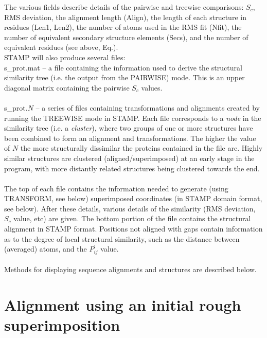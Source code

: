 The various fields describe details of the pairwise and treewise
comparisons: $S_{c}$, RMS deviation, the alignment length (Align),
the length of each structure in residues (Len1, Len2), the number of
atoms used in the RMS fit (Nfit), the number of equivalent secondary
structure elements (Secs), and the number of equivalent residues
(see above, Eq.).\\

STAMP will also produce several files: \\

s\_prot.mat -- a file containing the information used to derive the 
structural similarity tree (i.e. the output from the PAIRWISE) mode.  This
is an upper diagonal matrix containing the pairwise $S_{c}$ values.\\
\\
s\_prot.$N$ -- a series of files containing transformations and alignments 
created by running the TREEWISE mode in STAMP.  Each file corresponds to 
a {\em node} in the similarity tree (i.e. a {\em cluster}), where two 
groups of one or more structures have been combined to form an
alignment and transformations.  The higher the value of $N$ the more 
structurally dissimilar the proteins contained in the file are.  Highly 
similar structures are clustered (aligned/superimposed) at an early stage 
in the program, with more distantly related structures being clustered 
towards the end.\\
\\
The top of each file contains the information needed to generate (using
TRANSFORM, see below)
superimposed coordinates (in STAMP domain format, see below). 
After these details, various details of the similarity (RMS deviation, 
$S_{c}$ value, etc) are given.  The bottom portion of the file contains 
the structural alignment in STAMP format.  Positions not aligned with 
gaps contain information as to the degree of local structural similarity, 
such as the distance between (averaged) \Cal atoms, and the 
$P_{ij}^{\prime}$ value.\\
\\
Methods for displaying sequence alignments and structures are described below.

\section{Alignment using an initial rough superimposition}


